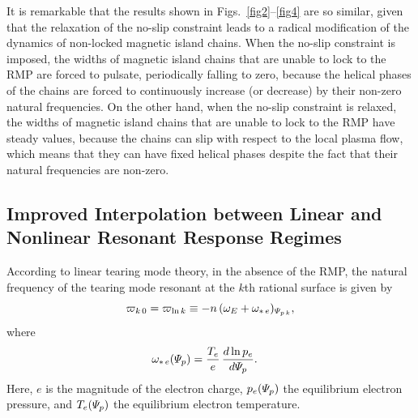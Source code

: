 \documentclass[12pt,prb,aps]{revtex4-1}
\begin{document}
It is remarkable that the results shown in Figs.~\ref{fig2}--\ref{fig4} are so similar, given that the relaxation of the no-slip constraint leads to a
radical modification of the dynamics of non-locked magnetic island chains. When the no-slip constraint is imposed, the widths of magnetic island chains that are
unable to lock to the RMP are forced to pulsate, periodically falling to zero, because the helical phases of the chains are forced to
continuously increase (or decrease) by their non-zero natural frequencies.\cite{rfb,rfc,rfisland,rf1,pulse} On the other hand, when the no-slip
constraint is relaxed, the widths of magnetic island chains that are unable to lock to the RMP have steady values, because the  chains can
slip with respect to the local plasma flow, which means that they can have fixed helical phases despite the fact that their natural
frequencies are non-zero. 

\subsection{Improved Interpolation between Linear and Nonlinear Resonant Response Regimes}\label{s4b}
According to linear tearing mode theory, in the absence of the RMP, the natural frequency of the tearing mode resonant at the $k$th rational surface is given by\,\cite{ara,lin1,lin2,lin3}
\begin{equation}\label{elin}
\varpi_{k\,0} = \varpi_{{\rm ln}\,k} \equiv - n\,(\omega_E+\omega_{\ast\,e})_{{\mit\Psi}_{p\,k}},
\end{equation}
where
\begin{align}
\omega_{\ast\,e}({\mit\Psi}_p) &=\frac{T_e}{e}\,\frac{d\ln p_e}{d{\mit\Psi}_p}.
\end{align}
 Here,  $e$ is the magnitude of the electron charge,  $p_e({\mit\Psi}_p)$  the equilibrium
electron pressure, and $T_e({\mit\Psi}_p)$ the equilibrium
electron temperature.
\end{document}
